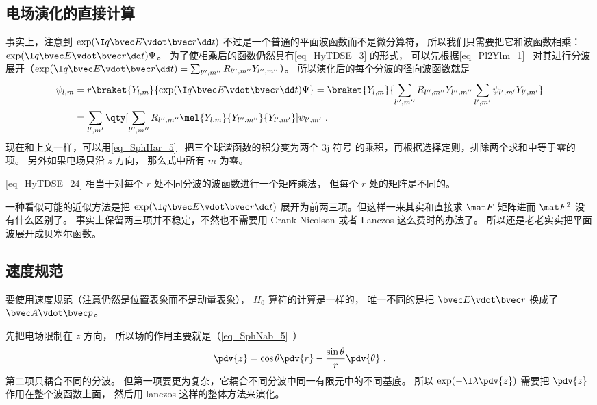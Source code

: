 \subsection{电场演化的直接计算}
事实上，注意到 $\exp(\I q\bvec E\vdot\bvec r\dd t)$ 不过是一个普通的平面波函数而不是微分算符， 所以我们只需要把它和波函数相乘： $\exp(\I q\bvec E\vdot\bvec r\dd t)\Psi$。 为了使相乘后的函数仍然具有\autoref{eq_HyTDSE_3} 的形式， 可以先根据\autoref{eq_Pl2Ylm_1}~ 对其进行分波展开（$\exp(\I q\bvec E\vdot\bvec r\dd t) = \sum_{l'',m''}R_{l'',m''}Y_{l'',m''}$）。 所以演化后的每个分波的径向波函数就是
\begin{equation}\label{eq_HyTDSE_24}
\begin{aligned}
\psi_{l,m} &= r\braket{Y_{l,m}}{\exp(\I q\bvec E\vdot\bvec r\dd t)\Psi} =
\braket{Y_{l,m}}{\sum_{l'',m''} R_{l'',m''} Y_{l'',m''} \sum_{l',m'} \psi_{l',m'} Y_{l',m'}}\\
&= \sum_{l',m'} \qty[\sum_{l'',m''}R_{l'',m''}  \mel{Y_{l,m}}{Y_{l'',m''}}{Y_{l',m'}}]\psi_{l',m'}~.
\end{aligned}
\end{equation}
现在和上文一样，可以用\autoref{eq_SphHar_5}~ 把三个球谐函数的积分变为两个 3j 符号 的乘积，再根据选择定则，排除两个求和中等于零的项。 另外如果电场只沿 $z$ 方向， 那么式中所有 $m$ 为零。

\autoref{eq_HyTDSE_24} 相当于对每个 $r$ 处不同分波的波函数进行一个矩阵乘法， 但每个 $r$ 处的矩阵是不同的。

一种看似可能的近似方法是把 $\exp(\I q\bvec E\vdot\bvec r\dd t)$ 展开为前两三项。但这样一来其实和直接求 $\mat F$ 矩阵进而 $\mat F^2$ 没有什么区别了。 事实上保留两三项并不稳定，不然也不需要用 Crank-Nicolson 或者 Lanczos 这么费时的办法了。 所以还是老老实实把平面波展开成贝塞尔函数。

\subsection{速度规范}\label{sub_HyTDSE_1}
要使用速度规范（注意仍然是位置表象而不是动量表象）， $H_0$ 算符的计算是一样的， 唯一不同的是把 $\bvec E\vdot \bvec r$ 换成了 $\bvec A\vdot \bvec p$。

先把电场限制在 $z$ 方向， 所以场的作用主要就是（\autoref{eq_SphNab_5}~）
\begin{equation}\label{eq_HyTDSE_25}
\pdv{z} = \cos\theta\pdv{r} - \frac{\sin\theta}{r}\pdv{\theta}~.
\end{equation}
第二项只耦合不同的分波。 但第一项要更为复杂，它耦合不同分波中同一有限元中的不同基底。 所以 $\exp(-\I \lambda \pdv{z})$ 需要把 $\pdv{z}$ 作用在整个波函数上面， 然后用 lanczos 这样的整体方法来演化。

